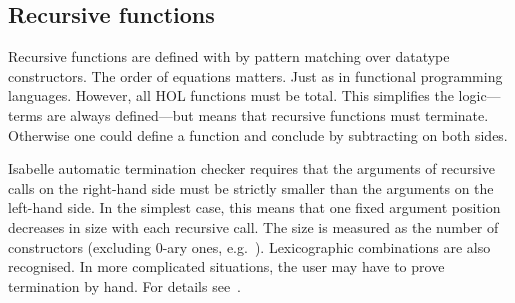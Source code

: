 \begin{isabellebody}
\begin{isamarkuptext}
\subsection{Recursive functions}
\label{sec:recursive-funs}

Recursive functions are defined with  by pattern matching
over datatype constructors. The order of equations matters. Just as in
functional programming languages. However, all HOL functions must be
total. This simplifies the logic---terms are always defined---but means
that recursive functions must terminate. Otherwise one could define a
function  and conclude \mbox{} by
subtracting  on both sides.

Isabelle automatic termination checker requires that the arguments of
recursive calls on the right-hand side must be strictly smaller than the
arguments on the left-hand side. In the simplest case, this means that one
fixed argument position decreases in size with each recursive call. The size
is measured as the number of constructors (excluding 0-ary ones, e.g.\ ). Lexicographic combinations are also recognised. In more complicated
situations, the user may have to prove termination by hand. For details
see~\cite{Krauss}.


\end{isamarkuptext}
\end{isabellebody}
